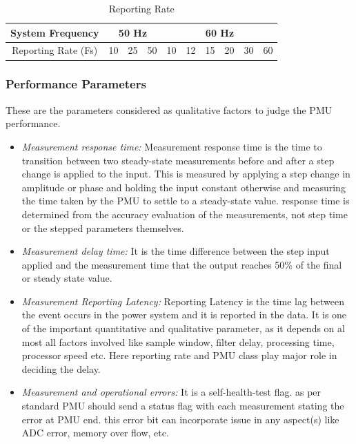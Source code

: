 \begin{table}
	\begin{center}
		\setlength\arrayrulewidth{1pt}
		\begin{tabular}{|c|c|c|c|c|c|c|c|c|c|}
			\hline
			System Frequency & \multicolumn{3}{c}{50 Hz} & \multicolumn{6}{|c|}{60 Hz}\\
			\hline 
			Reporting Rate (Fs)& 10 & 25 & 50 & 	10& 12 &15 & 20 & 30 & 60\\
			\hline
		\end{tabular}
	\end{center}
		\caption{Reporting Rate}
\end{table}
 

\subsubsection{Performance Parameters}
These are the parameters considered as qualitative factors to judge the PMU performance. 

\begin{itemize}
	\item  \textit{Measurement response time:} Measurement response time is the time to transition between two steady-state measurements before and
	after a step change is applied to the input. This is measured by applying a step change in amplitude or phase and holding the input constant otherwise and measuring the time taken  by the PMU to settle to a steady-state value. response time is determined from the accuracy evaluation of the measurements, not step time or the stepped	parameters themselves.
	\item \textit{Measurement delay time:} It is the time difference between the step input applied and the measurement time that the output reaches 50\% of the final or steady state value.  
	\item \textit{Measurement Reporting Latency:} Reporting Latency is the time lag between the event occurs in the power system and it is reported in the data. It is one of the important quantitative and qualitative parameter, as it depends on al most all factors involved like sample window, filter delay, processing time, processor speed etc. Here reporting rate and PMU class play major role in deciding the delay. 
	\item \textit{Measurement and operational errors:} It is a self-health-test flag. as per standard PMU should send a status flag with each measurement stating the error at PMU end. this error bit can incorporate issue in any aspect(s) like ADC error, memory over flow, etc.
\end{itemize}

